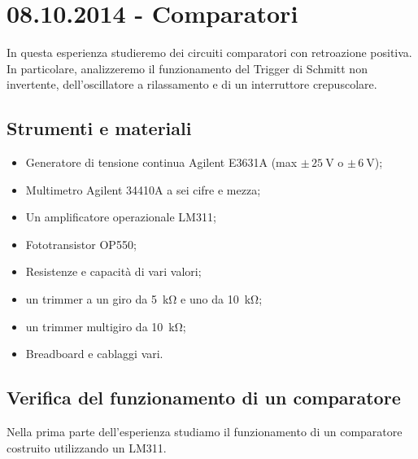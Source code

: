 \section{08.10.2014 - Comparatori}

In questa esperienza studieremo dei circuiti comparatori con retroazione positiva. In particolare, analizzeremo il funzionamento del Trigger di Schmitt non invertente, dell'oscillatore a rilassamento e di un interruttore crepuscolare. 


\subsection{Strumenti e materiali}

\begin{itemize} [noitemsep]
\item Generatore di tensione continua Agilent E3631A (max $\pm \, \SI{25}{\volt}$ o $\pm \, \SI{6}{\volt}$);
\item Multimetro Agilent 34410A a sei cifre e mezza;
\item Un amplificatore operazionale LM311;
\item Fototransistor OP550;
\item Resistenze e capacità di vari valori;
\item un trimmer a un giro da \SI{5}{\kilo\ohm} e uno da \SI{10}{\kilo\ohm};
\item un trimmer multigiro da \SI{10}{\kilo\ohm};
\item Breadboard e cablaggi vari.
\end{itemize}


\subsection{Verifica del funzionamento di un comparatore}
Nella prima parte dell'esperienza studiamo il funzionamento di un comparatore costruito utilizzando un LM311. 
